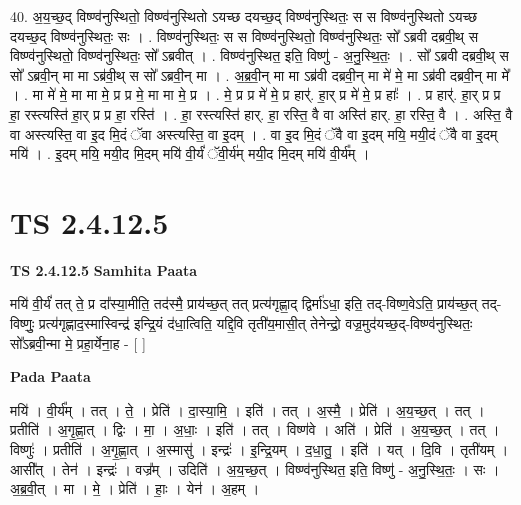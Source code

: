 \documentclass[17pt]{extarticle}
\begin{document}
40. अ॒य॒च्छ॒द् विष्ण्व॑नुस्थितो॒ विष्ण्व॑नुस्थितो ऽयच्छ दयच्छ॒द् विष्ण्व॑नुस्थितः॒ स स विष्ण्व॑नुस्थितो ऽयच्छ दयच्छ॒द् विष्ण्व॑नुस्थितः॒ सः । . विष्ण्व॑नुस्थितः॒ स स विष्ण्व॑नुस्थितो॒ विष्ण्व॑नुस्थितः॒ सो᳚ ऽब्रवी दब्रवी॒थ् स विष्ण्व॑नुस्थितो॒ विष्ण्व॑नुस्थितः॒ सो᳚ ऽब्रवीत् । . विष्ण्व॑नुस्थित॒ इति॒ विष्णु॑ - अ॒नु॒स्थि॒तः॒ । . सो᳚ ऽब्रवी दब्रवी॒थ् स सो᳚ ऽब्रवी॒न् मा मा ऽब्र॑वी॒थ् स सो᳚ ऽब्रवी॒न् मा । . अ॒ब्र॒वी॒न् मा मा ऽब्र॑वी दब्रवी॒न् मा मे॑ मे॒ मा ऽब्र॑वी दब्रवी॒न् मा मे᳚ । . मा मे॑ मे॒ मा मा मे॒ प्र प्र मे॒ मा मा मे॒ प्र । . मे॒ प्र प्र मे॑ मे॒ प्र हार्॑. हा॒र् प्र मे॑ मे॒ प्र हाः᳚ । . प्र हार्॑. हा॒र् प्र प्र हा॒ रस्त्यस्ति॑ हा॒र् प्र प्र हा॒ रस्ति॑ । . हा॒ रस्त्यस्ति॑ हार्. हा॒ रस्ति॒ वै वा अस्ति॑ हार्. हा॒ रस्ति॒ वै । . अस्ति॒ वै वा अस्त्यस्ति॒ वा इ॒द मि॒दं ॅवा अस्त्यस्ति॒ वा इ॒दम् । . वा इ॒द मि॒दं ॅवै वा इ॒दम् मयि॒ मयी॒दं ॅवै वा इ॒दम् मयि॑ । . इ॒दम् मयि॒ मयी॒द मि॒दम् मयि॑ वी॒र्यं॑ ॅवी॒र्य॑म् मयी॒द मि॒दम् मयि॑ वी॒र्य᳚म् । \newline
\pagebreak
{}
\section*{ TS 2.4.12.5 }

\textbf{TS 2.4.12.5 } \newline
\textbf{Samhita Paata} \newline

मयि॑ वी॒र्यं॑ तत् ते॒ प्र दा᳚स्या॒मीति॒ तद॑स्मै॒ प्राय॑च्छ॒त् तत् प्रत्य॑गृह्णा॒द् द्विर्मा॑ऽधा॒ इति॒ तद्-विष्ण॒वेऽति॒ प्राय॑च्छ॒त् तद्-विष्णुः॒ प्रत्य॑गृह्णाद॒स्मास्विन्द्र॑ इन्द्रि॒यं द॑धा॒त्विति॒ यद्दि॒वि तृती॑य॒मासी॒त् तेनेन्द्रो॒ वज्र॒मुद॑यच्छ॒द्-विष्ण्व॑नुस्थितः॒ सो᳚ऽब्रवी॒न्मा मे॒ प्रहा॒र्येना॒ह - [  ] \newline

\textbf{Pada Paata} \newline

मयि॑ । वी॒र्य᳚म् । तत् । ते॒ । प्रेति॑ । दा॒स्या॒मि॒ । इति॑ । तत् । अ॒स्मै॒ । प्रेति॑ । अ॒य॒च्छ॒त् । तत् । प्रतीति॑ । अ॒गृ॒ह्णा॒त् । द्विः । मा॒ । अ॒धाः॒ । इति॑ । तत् । विष्ण॑वे । अति॑ । प्रेति॑ । अ॒य॒च्छ॒त् । तत् । विष्णुः॑ । प्रतीति॑ । अ॒गृ॒ह्णा॒त् । अ॒स्मासु॑ । इन्द्रः॑ । इ॒न्द्रि॒यम् । द॒धा॒तु॒ । इति॑ । यत् । दि॒वि । तृती॑यम् । आसी᳚त् । तेन॑ । इन्द्रः॑ । वज्र᳚म् । उदिति॑ । अ॒य॒च्छ॒त् । विष्ण्व॑नुस्थित॒ इति॒ विष्णु॑ - अ॒नु॒स्थि॒तः॒ । सः । अ॒ब्र॒वी॒त् । मा । मे॒ । प्रेति॑ । हाः॒ । येन॑ । अ॒हम् ।  \newline
\end{document}
